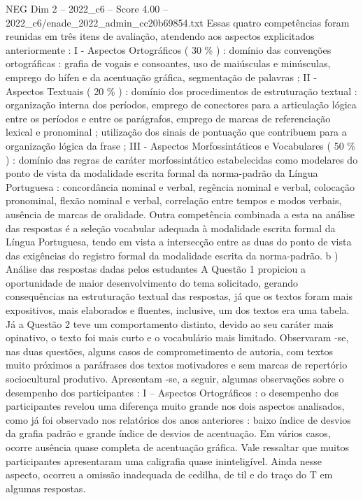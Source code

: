 \begin{textsample}{NEG Dim 2 – 2022\_c6 – Score 4.00 – 2022\_c6/enade\_2022\_admin\_cc20b69854.txt}
Essas quatro competências foram reunidas em três itens de avaliação, atendendo aos aspectos explicitados anteriormente : I - Aspectos Ortográficos ( 30 \% ) : domínio das convenções ortográficas : grafia de vogais e consoantes, uso de maiúsculas e minúsculas, emprego do hífen e da acentuação gráfica, segmentação de palavras ; II - Aspectos Textuais ( 20 \% ) : domínio dos procedimentos de estruturação textual : organização interna dos períodos, emprego de conectores para a articulação lógica entre os períodos e entre os parágrafos, emprego de marcas de referenciação lexical e pronominal ; utilização dos sinais de pontuação que contribuem para a organização lógica da frase ; III - Aspectos Morfossintáticos e Vocabulares ( 50 \% ) : domínio das regras de caráter morfossintático estabelecidas como modelares do ponto de vista da modalidade escrita formal da norma-padrão da Língua Portuguesa : concordância nominal e verbal, regência nominal e verbal, colocação pronominal, flexão nominal e verbal, correlação entre tempos e modos verbais, ausência de marcas de oralidade.
Outra competência combinada a esta na análise das respostas é a seleção vocabular adequada à modalidade escrita formal da Língua Portuguesa, tendo em vista a intersecção entre as duas do ponto de vista das exigências do registro formal da modalidade escrita da norma-padrão. b ) Análise das respostas dadas pelos estudantes A Questão 1 propiciou a oportunidade de maior desenvolvimento do tema solicitado, gerando consequências na estruturação textual das respostas, já que os textos foram mais expositivos, mais elaborados e fluentes, inclusive, um dos textos era uma tabela.
Já a Questão 2 teve um comportamento distinto, devido ao seu caráter mais opinativo, o texto foi mais curto e o vocabulário mais limitado.
Observaram -se, nas duas questões, alguns casos de comprometimento de autoria, com textos muito próximos a paráfrases dos textos motivadores e sem marcas de repertório sociocultural produtivo.
Apresentam -se, a seguir, algumas observações sobre o desempenho dos participantes : I – Aspectos Ortográficos : o desempenho dos participantes revelou uma diferença muito grande nos dois aspectos analisados, como já foi observado nos relatórios dos anos anteriores : baixo índice de desvios da grafia padrão e grande índice de desvios de acentuação.
Em vários casos, ocorre ausência quase completa de acentuação gráfica.
Vale ressaltar que muitos participantes apresentaram uma caligrafia quase ininteligível.
Ainda nesse aspecto, ocorreu a omissão inadequada de cedilha, de til e do traço do T em algumas respostas.

\end{textsample}
